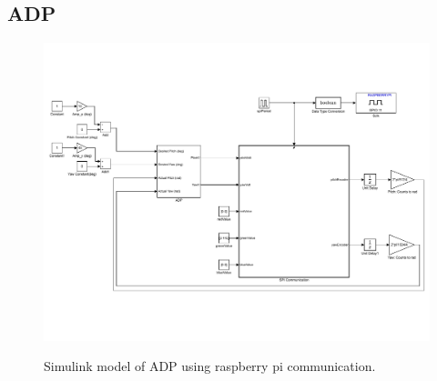 \subsection{ADP}
\begin{figure}[!htbp]
    \centering
    \includegraphics[width=.62\textwidth,keepaspectratio=true]{figs/img/ADP_RaspPi}
    \label{fig:ADP_RaspPi}
    \caption{Simulink model of ADP using raspberry pi communication.}
\end{figure}


